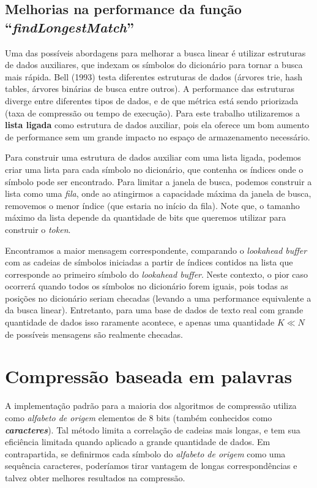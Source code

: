 \subsection{Melhorias na performance da função ``\emph{findLongestMatch}'' }

Uma das possíveis abordagens para melhorar a busca linear é utilizar estruturas de dados auxiliares, que indexam os símbolos do dicionário para tornar a busca mais rápida.
Bell (1993) \cite{TD}  testa diferentes estruturas de dados (árvores trie, hash tables, árvores binárias de busca entre outros). 
A performance das estruturas diverge entre diferentes tipos de dados, e de que métrica está sendo priorizada (taxa de compressão ou tempo de execução).
Para este trabalho utilizaremos a \textbf{lista ligada} como estrutura de dados auxiliar, 
pois ela oferece um bom aumento de performance sem um grande impacto no espaço de armazenamento necessário. 

Para construir uma estrutura de dados auxiliar com uma lista ligada, podemos criar uma lista para cada símbolo no dicionário, que contenha os índices onde o símbolo pode ser encontrado.  
Para limitar a janela de busca, podemos construir a lista como uma \emph{fila}, onde ao atingirmos a capacidade máxima da janela de busca, removemos o menor índice (que estaria no início da fila). 
Note que, o tamanho máximo da lista depende da quantidade de bits que queremos utilizar para construir o \emph{token}.

Encontramos a maior mensagem correspondente, comparando o \emph{lookahead buffer} com as cadeias de símbolos iniciadas a partir de índices contidos na lista que corresponde ao primeiro símbolo do \emph{lookahead buffer}.
Neste contexto, o pior caso ocorrerá quando todos os símbolos no dicionário forem iguais, pois todas as posições no dicionário seriam checadas (levando a uma performance equivalente a da busca linear).
Entretanto, para uma base de dados de texto real com grande quantidade de dados isso raramente acontece, e apenas uma quantidade $K \ll N$ de possíveis mensagens são realmente checadas.

\section{Compressão baseada em palavras}
A implementação padrão para a maioria dos algoritmos de compressão utiliza como \emph{alfabeto de origem} elementos de 8 bits (também conhecidos como \textbf{\emph{caracteres}}).
Tal método limita a correlação de cadeias mais longas, e tem sua eficiência limitada quando aplicado a grande quantidade de dados. 
Em contrapartida, se definirmos cada símbolo do \emph{alfabeto de origem} como uma sequência caracteres, poderíamos tirar vantagem de longas correspondências e talvez obter melhores resultados na compressão.

